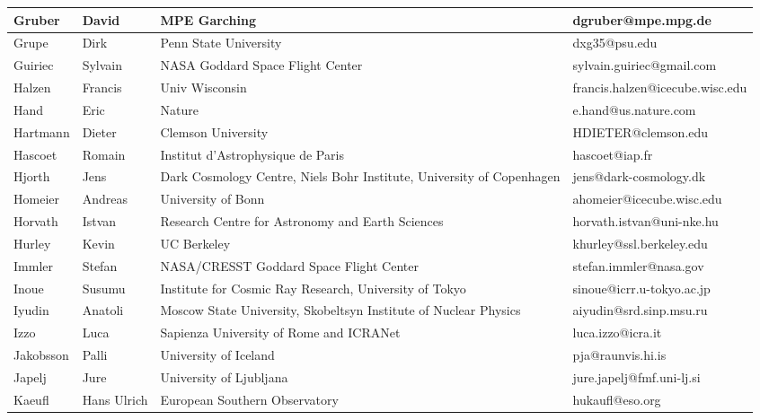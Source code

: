 \begin{center}
\begin{longtable}{|p{1.28cm} |p{1.28cm} |p{2.9cm} |p{3cm} |}
\tiny Gruber &\tiny David & \tiny MPE Garching & \tiny dgruber@mpe.mpg.de \\ \hline
\tiny Grupe &\tiny Dirk & \tiny Penn State University & \tiny dxg35@psu.edu \\ \hline
\tiny Guiriec &\tiny Sylvain & \tiny NASA Goddard Space Flight Center & \tiny sylvain.guiriec@gmail.com \\ \hline
\tiny Halzen &\tiny Francis & \tiny Univ Wisconsin & \tiny francis.halzen@icecube.wisc.edu \\ \hline
\tiny Hand &\tiny Eric & \tiny Nature & \tiny e.hand@us.nature.com \\ \hline
\tiny Hartmann &\tiny Dieter & \tiny Clemson University & \tiny HDIETER@clemson.edu \\ \hline
\tiny Hascoet &\tiny Romain & \tiny Institut d'Astrophysique de Paris & \tiny hascoet@iap.fr \\ \hline
\tiny Hjorth &\tiny Jens & \tiny Dark Cosmology Centre, Niels Bohr Institute, University of Copenhagen & \tiny jens@dark-cosmology.dk \\ \hline
\tiny Homeier &\tiny Andreas & \tiny University of Bonn & \tiny ahomeier@icecube.wisc.edu \\ \hline
\tiny Horvath &\tiny Istvan & \tiny Research Centre for Astronomy and Earth Sciences & \tiny horvath.istvan@uni-nke.hu \\ \hline
\tiny Hurley &\tiny Kevin & \tiny UC Berkeley & \tiny khurley@ssl.berkeley.edu \\ \hline
\tiny Immler &\tiny Stefan & \tiny NASA/CRESST Goddard Space Flight Center & \tiny stefan.immler@nasa.gov \\ \hline
\tiny Inoue &\tiny Susumu & \tiny Institute for Cosmic Ray Research, University of Tokyo & \tiny sinoue@icrr.u-tokyo.ac.jp \\ \hline
\tiny Iyudin &\tiny Anatoli & \tiny Moscow State University, Skobeltsyn Institute of Nuclear Physics & \tiny aiyudin@srd.sinp.msu.ru \\ \hline
\tiny Izzo &\tiny Luca & \tiny Sapienza University of Rome and ICRANet & \tiny luca.izzo@icra.it \\ \hline
\tiny Jakobsson &\tiny Palli & \tiny University of Iceland & \tiny pja@raunvis.hi.is \\ \hline
\tiny Japelj &\tiny Jure & \tiny University of Ljubljana & \tiny jure.japelj@fmf.uni-lj.si \\ \hline
\tiny Kaeufl &\tiny Hans Ulrich & \tiny European Southern Observatory & \tiny hukaufl@eso.org \\ \hline

\end{longtable}
\end{center}
